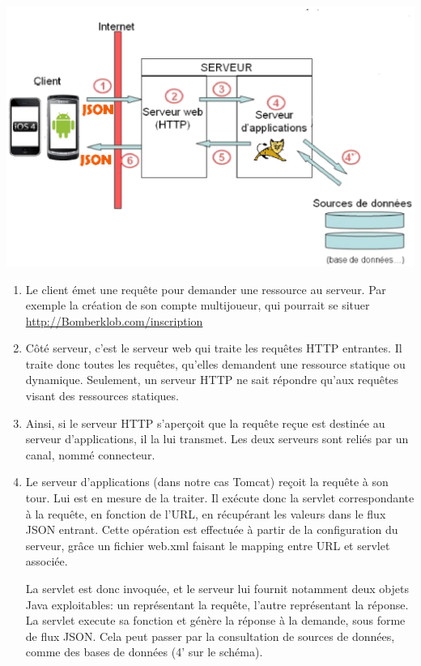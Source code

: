 		\begin{center}
			\includegraphics[width=16cm]{Analyse/Img/serveurappli.eps}
		\end{center}
		
		\begin{enumerate}

			\item 
					Le client émet une requête pour demander une
					ressource au serveur. Par exemple la création de son compte multijoueur,
					qui pourrait se situer \url{http://Bomberklob.com/inscription}
			\item
					Côté serveur, c'est le serveur web qui traite les
					requêtes HTTP entrantes. Il traite donc toutes les requêtes, qu'elles
					demandent une ressource statique ou dynamique. Seulement, un serveur HTTP
					ne sait répondre qu'aux requêtes visant des ressources statiques.

			\item 
					Ainsi, si le serveur HTTP s'aperçoit que la requête reçue est destinée
					au serveur d'applications, il la lui transmet. Les deux serveurs sont
					reliés par un canal, nommé connecteur.
		
			\item
					Le serveur d'applications (dans notre cas Tomcat) reçoit la requête à
					son tour. Lui est en mesure de la traiter. Il exécute donc la servlet
					correspondante à la requête, en fonction de l'URL, en récupérant les
					valeurs dans le flux JSON entrant. Cette opération est effectuée à partir
					de la configuration du serveur, grâce un fichier web.xml faisant le mapping
					entre URL et servlet associée.
		
					La servlet est donc invoquée, et le serveur lui fournit notamment deux
					objets Java exploitables: un représentant la requête, l'autre représentant
					la réponse. La servlet execute sa fonction et génère la réponse à la
					demande, sous forme de flux JSON. Cela peut passer par la consultation de
					sources de données, comme des bases de données (4' sur le schéma).		
		
		\end{enumerate}
		
